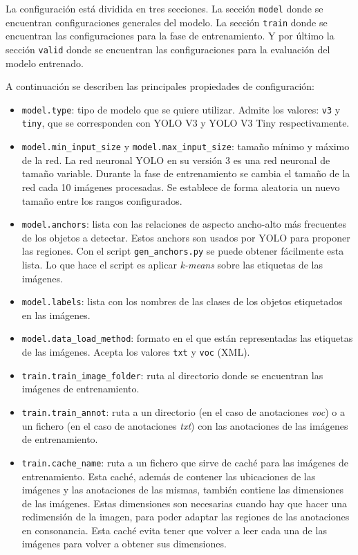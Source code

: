 La configuración está dividida en tres secciones. La sección \texttt{model} donde se encuentran configuraciones generales del modelo. La sección \texttt{train} donde se encuentran las configuraciones para la fase de entrenamiento. Y por último la sección \texttt{valid} donde se encuentran las configuraciones para la evaluación del modelo entrenado.

A continuación se describen las principales propiedades de configuración:

\begin{itemize}
	\item \texttt{model.type}: tipo de modelo que se quiere utilizar. Admite los valores: \texttt{v3} y \texttt{tiny}, que se corresponden con YOLO V3 y YOLO V3 Tiny respectivamente.
	\item \texttt{model.min\_input\_size} y \texttt{model.max\_input\_size}: tamaño mínimo y máximo de la red. La red neuronal YOLO en su versión 3 es una red neuronal de tamaño variable. Durante la fase de entrenamiento se cambia el tamaño de la red cada 10 imágenes procesadas. Se establece de forma aleatoria un nuevo tamaño entre los rangos configurados.
	\item \texttt{model.anchors}: lista con las relaciones de aspecto ancho-alto más frecuentes de los objetos a detectar. Estos anchors son usados por YOLO para proponer las regiones. Con el script \texttt{gen\_anchors.py} se puede obtener fácilmente esta lista. Lo que hace el script es aplicar \textit{k-means} sobre las etiquetas de las imágenes.
	\item \texttt{model.labels}: lista con los nombres de las clases de los objetos etiquetados en las imágenes.
	\item \texttt{model.data\_load\_method}: formato en el que están representadas las etiquetas de las imágenes. Acepta los valores \texttt{txt} y \texttt{voc} (XML).
	\item \texttt{train.train\_image\_folder}: ruta al directorio donde se encuentran las imágenes de entrenamiento.
	\item \texttt{train.train\_annot}: ruta a un directorio (en el caso de anotaciones \textit{voc}) o a un fichero (en el caso de anotaciones \textit{txt}) con las anotaciones de las imágenes de entrenamiento.
	\item \texttt{train.cache\_name}: ruta a un fichero que sirve de caché para las imágenes de entrenamiento. Esta caché, además de contener las ubicaciones de las imágenes y las anotaciones de las mismas, también contiene las dimensiones de las imágenes. Estas dimensiones son necesarias cuando hay que hacer una redimensión de la imagen, para poder adaptar las regiones de las anotaciones en consonancia. Esta caché evita tener que volver a leer cada una de las imágenes para volver a obtener sus dimensiones.

\end{itemize}
